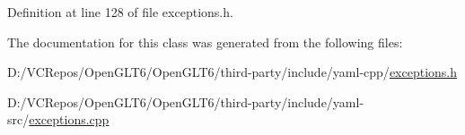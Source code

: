 Definition at line 128 of file exceptions.\+h.



The documentation for this class was generated from the following files\+:\begin{DoxyCompactItemize}
\item 
D\+:/\+V\+C\+Repos/\+Open\+G\+L\+T6/\+Open\+G\+L\+T6/third-\/party/include/yaml-\/cpp/\mbox{\hyperlink{exceptions_8h}{exceptions.\+h}}\item 
D\+:/\+V\+C\+Repos/\+Open\+G\+L\+T6/\+Open\+G\+L\+T6/third-\/party/include/yaml-\/src/\mbox{\hyperlink{exceptions_8cpp}{exceptions.\+cpp}}\end{DoxyCompactItemize}
